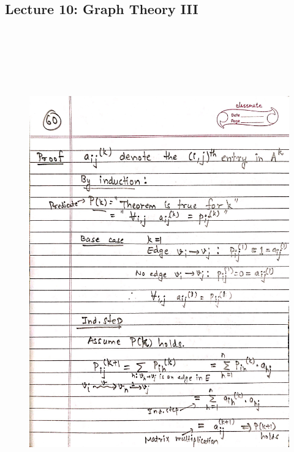 \newpage
{\color{black} \subsection*{Lecture 10: Graph Theory III}}
\begin{figure}[H]
    \centering
    \includegraphics[width=16cm, height=21cm]{"./MIT-6.042J/MIT-6042J-060"}
\end{figure}

